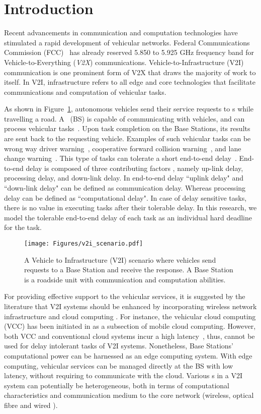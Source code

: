 
\section{Introduction}\label{sec:intro}
Recent advancements in communication and computation technologies have stimulated a rapid development of vehicular networks. Federal Communications Commission (FCC)~\cite{ali2011co} has already reserved 5.850 to 5.925 GHz frequency band for Vehicle-to-Everything (\emph{V2X}) communications. Vehicle-to-Infrastructure (V2I) communication is one prominent form of V2X that draws the majority of work to itself. In V2I, infrastructure refers to all edge and core technologies that facilitate communications and computation of vehicular tasks.

As shown in Figure~\ref{fig:scen}, autonomous vehicles send their service requests to \bs s while travelling a road. A \bs~(BS) is capable of communicating with vehicles, and can process vehicular tasks~\cite{bok2016multiple}. Upon task completion on the Base Stations, its results are sent back to the requesting vehicle. Examples of such vehicular tasks can be wrong way driver warning~\cite{ABIresearch}, cooperative forward collision warning~\cite{ElBatt}, and lane change warning~\cite{ABIresearch}. This type of tasks can tolerate a short end-to-end delay~\cite{ali2011co}. End-to-end delay is composed of three contributing factors \cite{mostafa2011}, namely up-link delay, processing delay, and down-link delay. In end-to-end delay ``uplink delay" and ``down-link delay" can be defined as communication delay. Whereas processing delay can be defined as ``computational delay". In case of delay sensitive tasks, there is no value in executing tasks after their tolerable delay. In this research, we model the tolerable end-to-end delay of each task as an individual hard deadline for the task. 

\begin{figure}[h!]
\texttt{[image: Figures/v2i\_scenario.pdf]}
\caption{A Vehicle to Infrastructure (V2I) scenario where vehicles send requests to a Base Station and receive the response. A Base Station is a roadside unit with communication and computation abilities.\label{fig:scen}}
\end{figure}

For providing effective support to the vehicular services, it is suggested by the literature that V2I systems should be enhanced by incorporating wireless network infrastructure and cloud computing \cite{yu2016optimal}. For instance, the vehicular cloud computing (VCC) has been initiated in \cite{gerla2012} as a subsection of mobile cloud computing. However, both VCC and conventional cloud systems incur a high latency~\cite{li2017resource}, thus, cannot be used for delay intolerant tasks of V2I systems. Nonetheless, Base Stations' computational power can be harnessed as an edge computing system. With edge computing, vehicular services can be managed directly at the BS with low latency, without requiring to communicate with the cloud. Various \bs s in a V2I system can potentially be heterogeneous, both in terms of computational characteristics and communication medium to the core network (\eg wireless, optical fibre and wired \cite{bok2016multiple}). 

